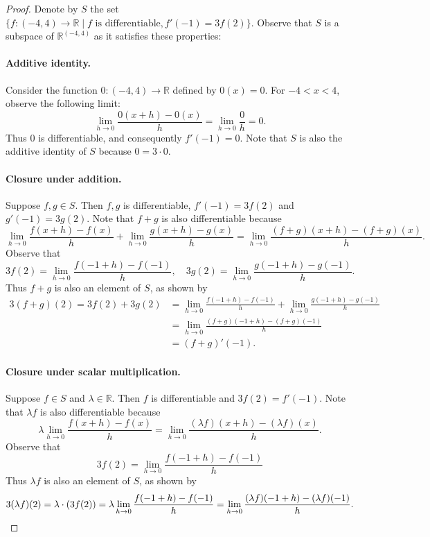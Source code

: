 \documentclass{exam}
\begin{document}
\begin{proof}
    Denote by $S$ the set $\{f:(-4, 4)\to\mathbb R\mid f\text{ is differentiable},f'(-1) = 3f(2)\}$. Observe that $S$ is a subspace of $\mathbb R^{(-4, 4)}$ as it satisfies these properties:
    \paragraph{Additive identity.} Consider the function $0: (-4, 4)\to\mathbb R$ defined by $0(x) = 0$. For $-4 < x < 4$, observe the following limit: \[
        \lim_{h\to0}\frac{0(x + h) - 0(x)}h = \lim_{h\to0}\frac0h = 0.
    \]
    Thus $0$ is differentiable, and consequently $f'(-1) = 0$. Note that $S$ is also the additive identity of $S$ because $0 = 3\cdot0$.

    \paragraph{Closure under addition.} Suppose $f,g\in S$. Then $f, g$ is differentiable, $f'(-1) = 3f(2)$ and $g'(-1) = 3g(2)$. Note that $f + g$ is also differentiable because \[
        \lim_{h\to0}\frac{f(x + h) - f(x)}h + \lim_{h\to0}\frac{g(x + h) - g(x)}h = \lim_{h\to0}\frac{(f + g)(x + h) - (f + g)(x)}h.
    \]
    Observe that \[
        3f(2) = \lim_{h\to0}\frac{f(-1 + h) - f(-1)}h,\quad 3g(2) = \lim_{h\to0}\frac{g(-1 + h) - g(-1)}h.
    \]
    Thus $f + g$ is also an element of $S$, as shown by 
    \begin{align*}
        3(f+g)(2) = 3f(2) + 3g(2) &= \lim_{h\to0}\frac{f(-1 + h) - f(-1)}h + \lim_{h\to0}\frac{g(-1 + h) - g(-1)}h\\
        &= \lim_{h\to0}\frac{(f + g)(-1 + h) - (f + g)(-1)}h\\
        &=(f + g)'(-1).
    \end{align*}

    \paragraph{Closure under scalar multiplication.} Suppose $f\in S$ and $\lambda\in\mathbb R$. Then $f$ is differentiable and $3f(2) = f'(-1)$. Note that $\lambda f$ is also differentiable because \[
        \lambda\lim_{h\to0}\frac{f(x+h)-f(x)}h = \lim_{h\to0}\frac{(\lambda f)(x + h) - (\lambda f)(x)}h.
    \]
    Observe that \[
        3f(2) = \lim_{h\to0}\frac{f(-1 + h) - f(-1)}h
    \]
    Thus $\lambda f$ is also an element of $S$, as shown by \[
        3(\lambda f)(2) = \lambda\cdot(3f(2)) = \lambda\lim_{h\to0}\frac{f(-1 + h) - f(-1)}h = \lim_{h\to0}\frac{(\lambda f)(-1 + h) - (\lambda f)(-1)}h.\qedhere
    \]
\end{proof}
\end{document}
